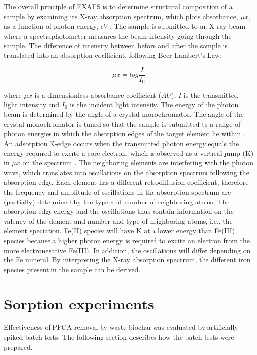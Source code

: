 The overall principle of EXAFS is to determine structural composition of a sample by examining its X-ray absorption spectrum, which plots absorbance, $\mu x$, as a function of photon energy, $eV$ \citep{vlaica2004exafs}. The sample is submitted to an X-ray beam where a spectrophotometer measures the beam intensity going through the sample. The difference of intensity between before and after the sample is translated into an absorption coefficient, following Beer-Lambert's Law: 

\begin{equation}\label{eq:absorbance}
    \mu x = log \frac{I}{I_0}
\end{equation}

where $\mu x$ is a dimensionless absorbance coefficient ($AU$), $I$ is the transmitted light intensity and $I_0$ is the incident light intensity. The energy of the photon beam is determined by the angle of a crystal monochromator. The angle of the crystal monochromator is tuned so that the sample is submitted to a range of photon energies in which the absorption edges of the target element lie within \citep{vlaica2004exafs}. An adsorption K-edge occurs when the transmitted photon energy equals the energy required to excite a core electron, which is observed as a vertical jump (K) in $\mu x$ on the spectrum \citep{vlaica2004exafs}. The neighboring elements are interfering with the photon wave, which translates into oscillations on the absorption spectrum following the absorption edge. Each element has a different retrodiffusion coefficient, therefore the frequency and amplitude of oscillations in the absorption spectrum are (partially) determined by the type and number of neighboring atoms. The absorption edge energy and the oscillations thus contain information on the valency of the element and number and type of neighboring atoms, i.e., the element speciation. Fe(II) species will have K at a lower energy than Fe(III) species because a higher photon energy is required to excite an electron from the more electronegative Fe(III). In addition, the oscillations will differ depending on the Fe mineral. By interpreting the X-ray absorption spectrum, the different iron species present in the sample can be derived.


\section{Sorption experiments}
Effectiveness of PFCA removal by waste biochar was evaluated by artificially spiked batch tests. The following section describes how the batch tests were prepared.

